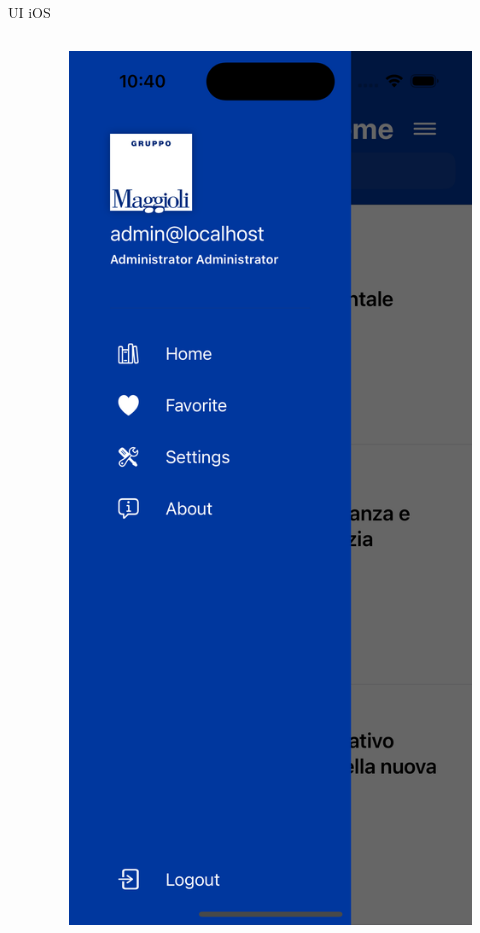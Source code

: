 \begin{frame}{UI iOS}
\begin{columns}[onlytextwidth]
\begin{column}{0.24\textwidth}
        \end{column}
        \begin{column}{0.24\textwidth}
        
            \begin{figure}[H]
                \includegraphics[width=1\textwidth]{img/sidenav_ios.png}
            \end{figure}
            

\end{column}
\end{columns}
\end{frame}
